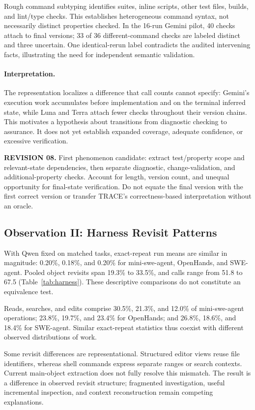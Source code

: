 \documentclass[10pt,a4paper,twocolumn]{article}
\newcommand{\rev}[2]{\par\smallskip\noindent\begin{minipage}{\linewidth}\color{revision}\footnotesize\textbf{REVISION #1.} #2\end{minipage}\par\smallskip}
\begin{document}
Rough command subtyping identifies suites, inline scripts, other test files, builds, and lint/type checks. This establishes heterogeneous command syntax, not necessarily distinct properties checked. In the 16-run Gemini pilot, 40 checks attach to final versions; 33 of 36 different-command checks are labeled distinct and three uncertain. One identical-rerun label contradicts the audited intervening facts, illustrating the need for independent semantic validation.

\paragraph{Interpretation.}
The representation localizes a difference that call counts cannot specify: Gemini's execution work accumulates before implementation and on the terminal inferred state, while Luna and Terra attach fewer checks throughout their version chains. This motivates a hypothesis about transitions from diagnostic checking to assurance. It does not yet establish expanded coverage, adequate confidence, or excessive verification.
\rev{08}{First phenomenon candidate: extract test/property scope and relevant-state dependencies, then separate diagnostic, change-validation, and additional-property checks. Account for length, version count, and unequal opportunity for final-state verification. Do not equate the final version with the first correct version or transfer TRACE's correctness-based interpretation without an oracle.}

\subsection{Observation II: Harness Revisit Patterns}
With Qwen fixed on matched tasks, exact-repeat run means are similar in magnitude: 0.20\%, 0.18\%, and 0.20\% for mini-swe-agent, OpenHands, and SWE-agent. Pooled object revisits span 19.3\% to 33.5\%, and calls range from 51.8 to 67.5 (Table~\ref{tab:harness}). These descriptive comparisons do not constitute an equivalence test.

Reads, searches, and edits comprise 30.5\%, 21.3\%, and 12.0\% of mini-swe-agent operations; 23.8\%, 19.7\%, and 23.4\% for OpenHands; and 26.8\%, 18.6\%, and 18.4\% for SWE-agent. Similar exact-repeat statistics thus coexist with different observed distributions of work.

Some revisit differences are representational. Structured editor views reuse file identifiers, whereas shell commands express separate ranges or search contexts. Current main-object extraction does not fully resolve this mismatch. The result is a difference in observed revisit structure; fragmented investigation, useful incremental inspection, and context reconstruction remain competing explanations.
\end{document}

